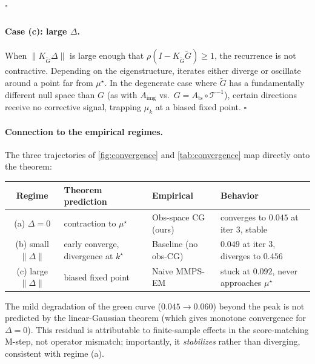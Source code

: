 "\documentclass{article}
\theoremstyle{plain}
\theoremstyle{definition}
\theoremstyle{remark}
\newcommand{\imgts}{\mathcal{T}^{-1}}
\newcommand{\Ats}{A_{\mathrm{ts}}}
\newcommand{\Aimg}{A_{\mathrm{img}}}
\begin{document}
\paragraph{Case (c): large $\Delta$.}
When $\|K_{\tilde{G}} \Delta\|$ is large enough that $\rho(I - K_{\tilde{G}} \tilde{G}) \geq 1$, the recurrence is not contractive. Depending on the eigenstructure, iterates either diverge or oscillate around a point far from $\mu^\star$. In the degenerate case where $\tilde{G}$ has a fundamentally different null space than $G$ (as with $\Aimg$ vs.\ $G = \Ats \circ \imgts$), certain directions receive no corrective signal, trapping $\mu_k$ at a biased fixed point. $\square$

\paragraph{Connection to the empirical regimes.}
The three trajectories of \cref{fig:convergence} and \cref{tab:convergence} map directly onto the theorem:
\begin{center}
\begin{tabular}{c|l|l|l}
\toprule
\textbf{Regime} & \textbf{Theorem prediction} & \textbf{Empirical} & \textbf{Behavior} \\
\midrule
(a) $\Delta = 0$        & contraction to $\mu^\star$     & Obs-space CG (ours)       & converges to $0.045$ at iter 3, stable \\
(b) small $\|\Delta\|$  & early converge, divergence at $k^\star$ & Baseline (no obs-CG)    & $0.049$ at iter 3, diverges to $0.456$ \\
(c) large $\|\Delta\|$  & biased fixed point              & Naive MMPS-EM             & stuck at $0.092$, never approaches $\mu^\star$ \\
\bottomrule
\end{tabular}
\end{center}

The mild degradation of the green curve ($0.045 \to 0.060$) beyond the peak is not predicted by the linear-Gaussian theorem (which gives monotone convergence for $\Delta = 0$). This residual is attributable to finite-sample effects in the score-matching M-step, not operator mismatch; importantly, it \emph{stabilizes} rather than diverging, consistent with regime (a).
\end{document}
